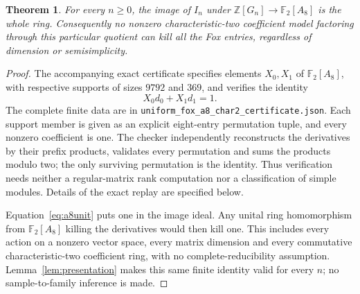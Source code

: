 \documentclass[11pt]{article}
\newtheorem{theorem}{Theorem}
\newcommand{\Z}{\mathbb Z}
\newcommand{\F}{\mathbb F}
\begin{document}
\begin{theorem}\label{thm:a8}
For every $n\ge0$, the image of $I_n$ under
$\Z[G_n]\longrightarrow\F_2[A_8]$ is the whole ring.
Consequently no nonzero characteristic-two coefficient model
factoring through this particular quotient can kill all the Fox
entries, regardless of dimension or semisimplicity.
\end{theorem}
\begin{proof}
The accompanying exact certificate specifies elements $X_0,X_1$ of
$\F_2[A_8]$, with respective supports of sizes $9792$ and $369$,
and verifies the identity
\begin{equation}\label{eq:a8unit}
                         X_0d_0+X_1d_1=1.
\end{equation}
The complete finite data are in
\texttt{uniform\_fox\_a8\_char2\_certificate.json}.
Each support member is given as an explicit eight-entry permutation
tuple, and every nonzero coefficient is one. The checker independently
reconstructs the derivatives by their prefix products, validates every
permutation and sums the products modulo two; the only surviving
permutation is the identity. Thus verification needs neither a
regular-matrix rank computation nor a classification of simple modules.
Details of the exact replay are specified below.

Equation~\eqref{eq:a8unit} puts one in the image ideal. Any unital ring
homomorphism from $\F_2[A_8]$ killing the derivatives would then kill
one. This includes every action on a nonzero vector space, every
matrix dimension and every commutative characteristic-two coefficient
ring, with no complete-reducibility assumption.
Lemma~\ref{lem:presentation} makes this same finite identity valid
for every $n$; no sample-to-family inference is made.
\end{proof}
\end{document}
